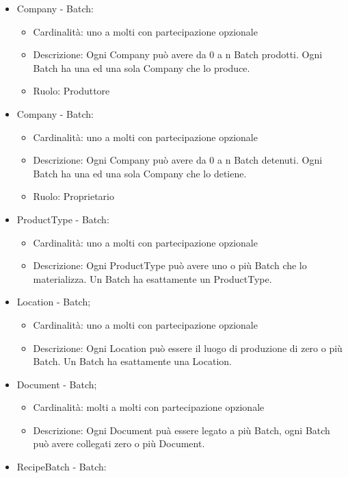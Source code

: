 \documentclass[a4paper,11pt]{article}
\begin{document}
\begin{itemize}
  \item Company - Batch:
        \begin{itemize}
          \item Cardinalità: uno a molti con partecipazione opzionale
          \item Descrizione: Ogni Company può avere da 0 a n Batch prodotti. Ogni Batch ha una ed una sola Company che lo produce.
          \item Ruolo: Produttore
        \end{itemize}
  \item Company - Batch:
        \begin{itemize}
          \item Cardinalità: uno a molti con partecipazione opzionale
          \item Descrizione: Ogni Company può avere da 0 a n Batch detenuti. Ogni Batch ha una ed una sola Company che lo detiene.
          \item Ruolo: Proprietario
        \end{itemize}
  \item ProductType - Batch:
        \begin{itemize}
          \item Cardinalità: uno a molti con partecipazione opzionale
          \item Descrizione: Ogni ProductType può avere uno o più Batch che lo materializza. Un Batch ha esattamente un ProductType.
        \end{itemize}
  \item Location - Batch;
        \begin{itemize}
          \item Cardinalità: uno a molti con partecipazione opzionale
          \item Descrizione: Ogni Location può essere il luogo di produzione di zero o più Batch. Un Batch ha esattamente una Location.
        \end{itemize}
  \item Document - Batch;
        \begin{itemize}
          \item Cardinalità: molti a molti con partecipazione opzionale
          \item Descrizione: Ogni Document puà essere legato a più Batch, ogni Batch può avere collegati zero o più Document.
        \end{itemize}
  \item RecipeBatch - Batch:

\end{itemize}
\end{document}
